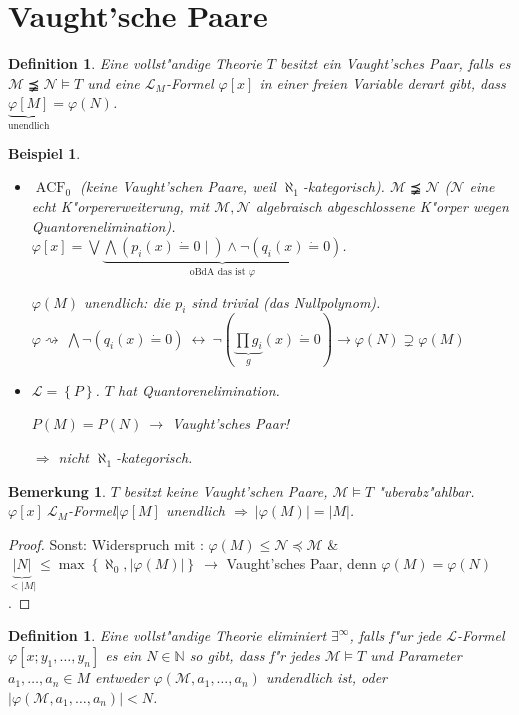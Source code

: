 \documentclass[a4paper,12pt,numbers=noenddot,parskip=full]{scrartcl}
\newcommand{\setN}{\mathbb{N}}
\newcommand{\scrL}{\mathcal{L}}
\newcommand{\scrM}{\mathcal{M}}
\newcommand{\scrN}{\mathcal{N}}
\DeclareMathOperator{\acf}{ACF}
\theoremstyle{dotless}
\newtheorem{definition}[theorem]{Definition}
\newtheorem{example}[theorem]{Beispiel}
\newtheorem{remark}[theorem]{Bemerkung}
\begin{document}
\section{Vaught'sche Paare}
\begin{definition}
	Eine vollst"andige Theorie $T$ besitzt ein \emph{Vaught'sches Paar}, falls es $\scrM \precneqq \scrN \models T$ und eine $\scrL_M$-Formel $\varphi[x]$ in einer freien Variable derart gibt, dass $\underbrace{\varphi[M]}_\text{unendlich} = \varphi(N)$.
\end{definition}
\begin{example}
	\begin{itemize}
		\item $\acf_0$ (keine Vaught'schen Paare, weil $\aleph_1$-kategorisch). $\scrM \precneqq \scrN$ ($\scrN$ eine echt K"orpererweiterung, mit $\scrM,\scrN$ algebraisch abgeschlossene K"orper wegen Quantorenelimination).\\
		$\varphi[x] = \bigvee \underbrace{\bigwedge(p_i(x) \dot= 0 \mid) \land \lnot (q_i(x) \dot= 0)}_{\text{oBdA das ist }\varphi}$.
		
		$\varphi(M)$ unendlich: die $p_i$ sind \emph{trivial} (das Nullpolynom). \\
		$\varphi \rightsquigarrow~ \bigwedge \lnot (q_i(x) \dot= 0)~ \leftrightarrow~ \lnot\left(\underbrace{\prod g_i}_{g}(x) \dot= 0\right) \rightarrow \varphi(N) \supsetneq \varphi(M)$
		
		\item $\scrL = \left\{P\right\}$. %
		$T$ hat Quantorenelimination.
		
		$P(M) = P(N)~ \rightarrow$ Vaught'sches Paar!
		
		$\Rightarrow$ nicht $\aleph_1$-kategorisch.
		
	\end{itemize}
\end{example}
\begin{remark}
	$T$ besitzt keine Vaught'schen Paare, $\scrM \models T$ "uberabz"ahlbar. 			$\varphi[x]~\scrL_M$-Formel$\mid \varphi[M]$ unendlich $\Rightarrow~|\varphi(M)| = |M|$.
\end{remark}
\begin{proof}
	Sonst: Widerspruch mit : $\varphi(M) \leq \scrN \preceq \scrM$ \& $\underbrace{|N|}_{< |M|} \leq \max\left\{\aleph_0, |\varphi(M)|\right\}~ \rightarrow$ Vaught'sches Paar, denn $\varphi(M) = \varphi(N)$.
\end{proof}
\begin{definition}
	Eine vollst"andige Theorie \emph{eliminiert $\exists^\infty$}, falls f"ur jede $\scrL$-Formel $\varphi[x;y_1, \dots, y_n]$ es ein $N \in \setN$ so gibt, dass f"r jedes $\scrM \models T$ und Parameter $a_1, \dots, a_n \in M$ entweder $\varphi(\scrM, a_1, \dots, a_n)$ undendlich ist, oder $|\varphi(\scrM, a_1, \dots, a_n)| < N$.
\end{definition}
\end{document}
